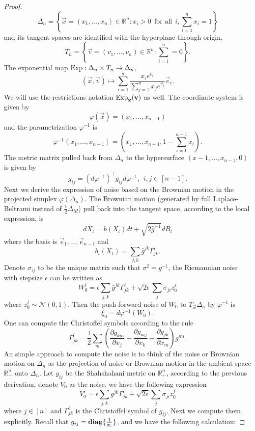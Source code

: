 \begin{proof}
\[
\Delta_n=\left\{\vec{x}=(x_1,...,x_n)\in\mathbb{R}^n:x_i>0\ \ \text{for all}\ \ i,\sum_{i=1}^nx_i=1\right\}
\]
and its tangent spaces are identified with the hyperplane through origin,
\[
T_n=\left\{\vec{v}=(v_1,...,v_n)\in\mathbb{R}^n:\sum_{i=1}^n=0\right\}.
\]
The exponential map $\mathrm{Exp}:\Delta_n\times T_n\rightarrow\Delta_n$,
\[
(\vec{x},\vec{v})\mapsto\sum_{i=1}^n\frac{x_ie^{v_i}}{\sum_{j=1}^nx_je^{v_j}}\vec{e}_i.
\]
We will use the restrictions notation $\mathrm{Exp}_{\mathbf{x}}(\mathbf{v})$ as well. The coordinate system is given by 
\[
\varphi(\vec{x})=(x_1,...,x_{n-1}) 
\]
and the parametrization $\varphi^{-1}$ is
\[
\varphi^{-1}(x_1,...,x_{n-1})=(x_1,...,x_{n-1},1-\sum_{i=1}^{n-1}x_i).
\]
The metric matrix pulled back from $\Delta_n$ to the hypersurface $(x-1,...,x_{n-1},0)$ is given by
\[
\bar{g}_{ij}=(d\varphi^{-1})^{\top}g_{ij}d\varphi^{-1}, \ \ i,j\in [n-1].
\]
Next we derive the expression of noise based on the Brownian motion in the projected simplex $\varphi(\Delta_n)$. The Brownian motion (generated by full Laplace-Beltrami instead of $\frac{1}{2}\Delta_M$) pull back into the tangent space, according to the local expression, is
\[
dX_t=b(X_t)dt+\sqrt{2\bar{g}^{-1}}dB_t
\]
where the basis is $\vec{e}_1,...,\vec{e}_{n-1}$ and 
\[
b_i(X_t)=\sum_{j,k}\bar{g}^{jk}\Gamma^i_{jk}.
\]
Denote $\sigma_{ij}$ to be the unique matrix such that $\sigma^2=g^{-1}$, the Riemannian noise with stepsize $\epsilon$ can be written as
\[
W_0^i=\epsilon\sum_{j,k}\bar{g}^{jk}\Gamma^i_{jk}+\sqrt{2\epsilon}\sum_j\sigma_{ji}z^j_0
\]
where $z^j_0\sim\mathcal{N}(0,1)$. Then the push-forward noise of $W_0$ to $T_{\vec{x}}\Delta_n$ by $\varphi^{-1}$ is 
\[
\xi_0=d\varphi^{-1}(W_0).
\] 
One can compute the Christoffel symbols according to the rule
\[
\Gamma^i_{jk}=\frac{1}{2}\sum_m\left(\frac{\partial g_{km}}{\partial x_j}+\frac{\partial g_{mj}}{\partial x_k}-\frac{\partial g_{jk}}{\partial x_m}\right)g^{mi}.
\]
An simple approach to compute the noise is to think of the noise or Brownian motion on $\Delta_n$ as the projection of noise or Brownian motion in the ambient space $\mathbb{R}^n_+$ onto $\Delta_n$. Let $g_{ij}$ be the Shahshahani metric on $\mathbb{R}^n_+$, according to the previous derivation, denote $V_0$ as the noise, we have the following expression 
\[
V^i_0=\epsilon\sum_{j,k}g^{jk}\Gamma^i_{jk}+\sqrt{2\epsilon}\sum_j\sigma_{ji}z_0^j
\]
where $j\in[n]$ and $\Gamma^i_{jk}$ is the Christoffel symbol of $g_{ij}$. Next we compute them explicitly. Recall that $g_{ij}=\mathop{\mathbf{diag}}\{\frac{1}{x_i}\}$, and we have the following calculation:


\end{proof}
